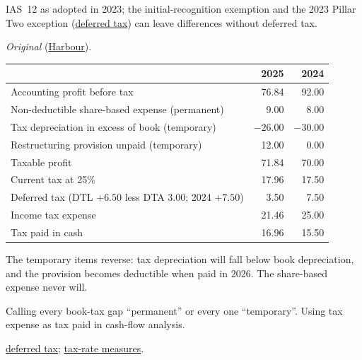 \begin{qfdefinition}
 IAS~12 as adopted in 2023; the initial-recognition exemption and the 2023 Pillar Two exception (\hyperref[meth:deferred-tax-analysis]{deferred tax}) can leave differences without deferred tax.

 \emph{Original} (\hyperref[ex:harbour-tools-statements]{Harbour}).

\begin{center}\small
\begin{tabular}{@{}lrr@{}}
\toprule
 & 2025 & 2024\\
\midrule
Accounting profit before tax & 76.84 & 92.00\\
Non-deductible share-based expense (permanent) & 9.00 & 8.00\\
Tax depreciation in excess of book (temporary) & $-26.00$ & $-30.00$\\
Restructuring provision unpaid (temporary) & 12.00 & 0.00\\
Taxable profit & 71.84 & 70.00\\
Current tax at 25\% & 17.96 & 17.50\\
Deferred tax (DTL $+6.50$ less DTA $3.00$; 2024 $+7.50$) & 3.50 & 7.50\\
Income tax expense & 21.46 & 25.00\\
Tax paid in cash & 16.96 & 15.50\\
\bottomrule
\end{tabular}
\end{center}
The temporary items reverse: tax depreciation will fall below book depreciation, and the provision becomes deductible when paid in 2026. The share-based expense never will.

 Calling every book-tax gap ``permanent'' or every one ``temporary''. Using tax expense as tax paid in cash-flow analysis.

 \hyperref[meth:deferred-tax-analysis]{deferred tax}; \hyperref[meth:tax-rate-measures]{tax-rate measures}.

\end{qfdefinition}

